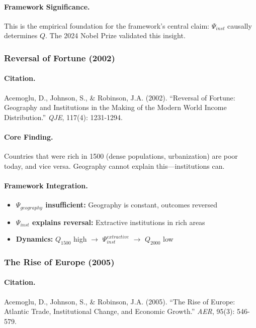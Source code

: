 \paragraph{Framework Significance.}
This is the empirical foundation for the framework's central claim:
$\Psi_{inst}$ causally determines $Q$. The 2024 Nobel Prize validated this insight.

\subsubsection{Reversal of Fortune (2002)}

\paragraph{Citation.}
Acemoglu, D., Johnson, S., \& Robinson, J.A. (2002).
``Reversal of Fortune: Geography and Institutions in the Making of the
Modern World Income Distribution.'' \emph{QJE}, 117(4): 1231-1294.

\paragraph{Core Finding.}
Countries that were rich in 1500 (dense populations, urbanization)
are poor today, and vice versa. Geography cannot explain this---institutions can.

\paragraph{Framework Integration.}
\begin{itemize}
  \item \textbf{$\Psi_{geography}$ insufficient:} Geography is constant, outcomes reversed
  \item \textbf{$\Psi_{inst}$ explains reversal:} Extractive institutions in rich areas
  \item \textbf{Dynamics:} $Q_{1500}$ high $\to$ $\Psi_{inst}^{extractive}$ $\to$ $Q_{2000}$ low
\end{itemize}

\subsubsection{The Rise of Europe (2005)}

\paragraph{Citation.}
Acemoglu, D., Johnson, S., \& Robinson, J.A. (2005).
``The Rise of Europe: Atlantic Trade, Institutional Change, and Economic Growth.''
\emph{AER}, 95(3): 546-579.

